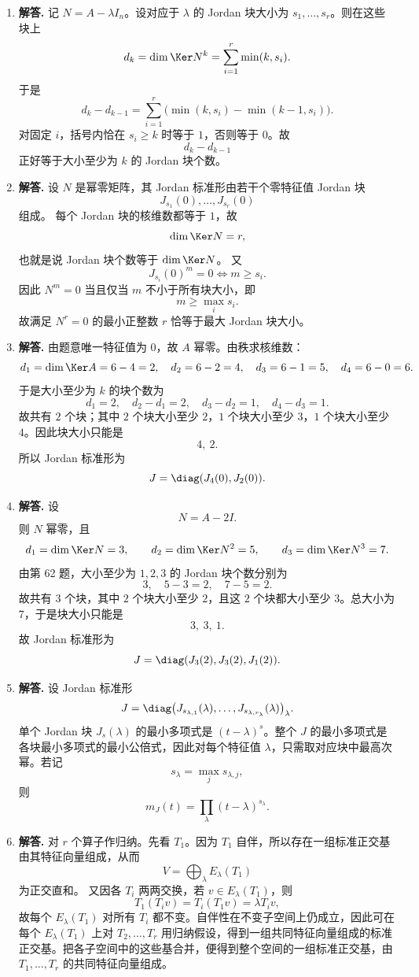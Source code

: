 \begin{enumerate}[label=\textbf{\arabic*.}, leftmargin=*, itemsep=1em]
\item \textbf{解答.} 记 \(N=A-\lambda I_n\)。设对应于 \(\lambda\) 的 Jordan 块大小为 \(s_1,\dots,s_r\)。则在这些块上
\[
d_k=\dim\Ker N^k=\sum_{i=1}^r \min(k,s_i).
\]
于是
\[
d_k-d_{k-1}
=\sum_{i=1}^r\bigl(\min(k,s_i)-\min(k-1,s_i)\bigr).
\]
对固定 \(i\)，括号内恰在 \(s_i\ge k\) 时等于 \(1\)，否则等于 \(0\)。故
\[
d_k-d_{k-1}
\]
正好等于大小至少为 \(k\) 的 Jordan 块个数。

\item \textbf{解答.} 设 \(N\) 是幂零矩阵，其 Jordan 标准形由若干个零特征值 Jordan 块
\[
J_{s_1}(0),\dots,J_{s_r}(0)
\]
组成。  
每个 Jordan 块的核维数都等于 \(1\)，故
\[
\dim\Ker N=r,
\]
也就是说 Jordan 块个数等于 \(\dim\Ker N\)。  
又
\[
J_{s_i}(0)^m=0 \iff m\ge s_i.
\]
因此 \(N^m=0\) 当且仅当 \(m\) 不小于所有块大小，即
\[
m\ge \max_i s_i.
\]
故满足 \(N^r=0\) 的最小正整数 \(r\) 恰等于最大 Jordan 块大小。

\item \textbf{解答.} 由题意唯一特征值为 \(0\)，故 \(A\) 幂零。由秩求核维数：
\[
d_1=\dim\Ker A=6-4=2,\quad
d_2=6-2=4,\quad
d_3=6-1=5,\quad
d_4=6-0=6.
\]
于是大小至少为 \(k\) 的块个数为
\[
d_1=2,\quad d_2-d_1=2,\quad d_3-d_2=1,\quad d_4-d_3=1.
\]
故共有 \(2\) 个块；其中 \(2\) 个块大小至少 \(2\)，\(1\) 个块大小至少 \(3\)，\(1\) 个块大小至少 \(4\)。因此块大小只能是
\[
4,\ 2.
\]
所以 Jordan 标准形为
\[
J=\diag(J_4(0),J_2(0)).
\]

\item \textbf{解答.} 设
\[
N=A-2I.
\]
则 \(N\) 幂零，且
\[
d_1=\dim\Ker N=3,\qquad d_2=\dim\Ker N^2=5,\qquad d_3=\dim\Ker N^3=7.
\]
由第 62 题，大小至少为 \(1,2,3\) 的 Jordan 块个数分别为
\[
3,\quad 5-3=2,\quad 7-5=2.
\]
故共有 \(3\) 个块，其中 \(2\) 个块大小至少 \(2\)，且这 \(2\) 个块都大小至少 \(3\)。总大小为 \(7\)，于是块大小只能是
\[
3,\ 3,\ 1.
\]
故 Jordan 标准形为
\[
J=\diag(J_3(2),J_3(2),J_1(2)).
\]

\item \textbf{解答.} 设 Jordan 标准形
\[
J=\diag\bigl(J_{s_{\lambda,1}}(\lambda),\dots,J_{s_{\lambda,r_\lambda}}(\lambda)\bigr)_\lambda.
\]
单个 Jordan 块 \(J_s(\lambda)\) 的最小多项式是 \((t-\lambda)^s\)。整个 \(J\) 的最小多项式是各块最小多项式的最小公倍式，因此对每个特征值 \(\lambda\)，只需取对应块中最高次幂。若记
\[
s_\lambda=\max_j s_{\lambda,j},
\]
则
\[
m_J(t)=\prod_\lambda (t-\lambda)^{s_\lambda}.
\]

\item \textbf{解答.} 对 \(r\) 个算子作归纳。先看 \(T_1\)。因为 \(T_1\) 自伴，所以存在一组标准正交基由其特征向量组成，从而
\[
V=\bigoplus_\lambda E_\lambda(T_1)
\]
为正交直和。  
又因各 \(T_i\) 两两交换，若 \(v\in E_\lambda(T_1)\)，则
\[
T_1(T_i v)=T_i(T_1v)=\lambda T_i v,
\]
故每个 \(E_\lambda(T_1)\) 对所有 \(T_i\) 都不变。自伴性在不变子空间上仍成立，因此可在每个 \(E_\lambda(T_1)\) 上对 \(T_2,\dots,T_r\) 用归纳假设，得到一组共同特征向量组成的标准正交基。把各子空间中的这些基合并，便得到整个空间的一组标准正交基，由 \(T_1,\dots,T_r\) 的共同特征向量组成。


\end{enumerate}
